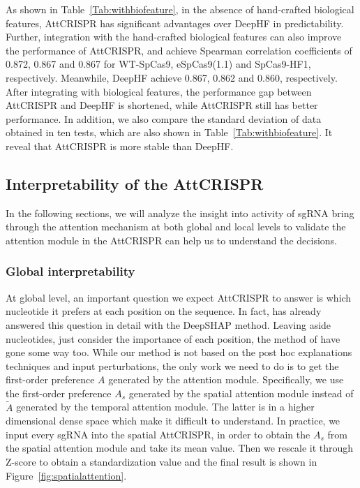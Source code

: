 \documentclass{bioinfo}
\begin{document}
As shown in Table~\ref{Tab:withbiofeature}, in the absence of hand-crafted biological features, AttCRISPR has significant advantages over DeepHF in predictability. 
Further, integration with the hand-crafted biological features can also improve the performance of AttCRISPR, and achieve Spearman correlation coefficients of 0.872, 0.867 and 0.867 for WT-SpCas9, eSpCas9(1.1) and SpCas9-HF1, respectively. Meanwhile, DeepHF achieve 0.867, 0.862 and 0.860, respectively. 
After integrating with biological features, the performance gap between AttCRISPR and DeepHF is shortened, while AttCRISPR still has better performance. In addition, we also compare the standard deviation of data obtained in ten tests, which are also shown in Table~\ref{Tab:withbiofeature}. 
It reveal that AttCRISPR is more stable than DeepHF.

\subsection{Interpretability of the AttCRISPR}\label{section:interpretability}

In the following sections, we will analyze the insight into activity of sgRNA bring through the attention mechanism at both global and local levels 
to validate the attention module in the AttCRISPR can help us to understand the decisions. 
\subsubsection{Global interpretability}

At global level, an important question we expect AttCRISPR to answer is which nucleotide it prefers at each position on the sequence. 
In fact, \citeauthor{wang2019optimized} has already answered this question in detail with the DeepSHAP method.
Leaving aside nucleotides, just consider the importance of each position, the method of \citeauthor{Liu2019} have gone some way too. 
While our method is not based on the post hoc explanations techniques and input perturbations, the only work we need to do is to get the first-order preference $A$ generated by the attention module.
Specifically, we use the first-order preference $A_s$ generated by the spatial attention module instead of  $\tilde{A}$ generated by the temporal attention module. 
The latter is in a higher dimensional dense space which make it difficult to understand. 
In practice, we input every sgRNA into the spatial AttCRISPR, in order to obtain the $A_s$ from the spatial attention module and take its mean value. 
Then we rescale it through Z-score to obtain a standardization value and the final result is shown in Figure~\ref{fig:spatialattention}. 
\end{document}
